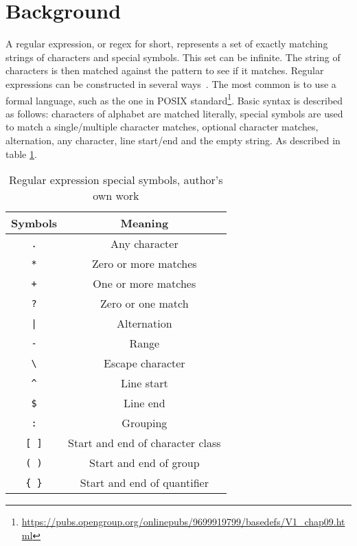 \documentclass[10pt,onecolumn,twoside,english,a4paper]{article}
\begin{document}
\section{Background} \label{Background}
A regular expression, or regex for short, represents a set of exactly matching strings of characters and special symbols. This set can be infinite. The string of characters is then matched against the pattern to see if it matches. Regular expressions can be constructed in several ways~\cite{wang2014techniques}. The most common is to use a formal language, such as the one in POSIX standard\footnote{\url{https://pubs.opengroup.org/onlinepubs/9699919799/basedefs/V1_chap09.html}}.
Basic syntax is described as follows: characters of alphabet are matched literally, special symbols are used to match a single/multiple character matches, optional character matches, alternation, any character, line start/end and the empty string. As described in table \ref{table:regex_special_symbols}.


\begin{table}[h!]
	\centering
	\begin{tabular}{ |c|c| }
		\hline
		\textbf{Symbols}        & \textbf{Meaning}                 \\
		\hline
		\texttt{.}              & Any character                    \\
		\hline
		\texttt{*}              & Zero or more matches             \\
		\hline
		\texttt{+}              & One or more matches              \\
		\hline
		\texttt{?}              & Zero or one match                \\
		\hline
		\texttt{|}              & Alternation                      \\
		\hline
		\texttt{-}              & Range                            \\
		\hline
		\texttt{\textbackslash} & Escape character                 \\
		\hline
		\texttt{\^{}}           & Line start                       \\
		\hline
		\texttt{\$}             & Line end                         \\
		\hline
		\texttt{:}              & Grouping                         \\
		\hline
		\texttt{[ ]}            & Start and end of character class \\
		\hline
		\texttt{( )}            & Start and end of group           \\
		\hline
		\texttt{\{ \}}          & Start and end of quantifier      \\
		\hline
	\end{tabular}
	\caption{Regular expression special symbols, author's own work }
	\label{table:regex_special_symbols}
\end{table}
\end{document}
